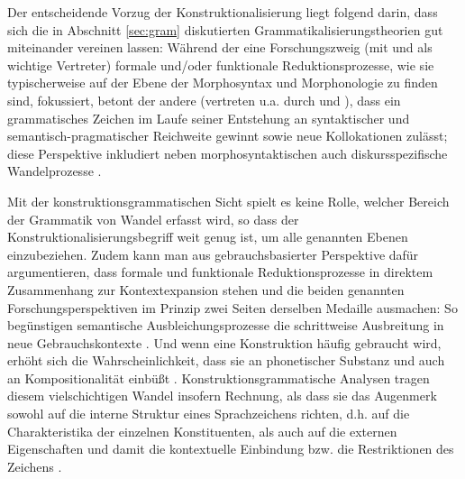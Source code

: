 Der entscheidende Vorzug der Konstruktionalisierung liegt \textcite[60--62]{Traugott2015} folgend darin, dass sich die in Abschnitt \ref{sec:gram}  diskutierten Grammatikalisierungstheorien gut miteinander vereinen lassen: Während der eine Forschungszweig (mit \citealt{Lehmann1995} und \citealt{Haspelmath2004} als wichtige Vertreter) formale und/\-oder funktionale Reduktionsprozesse, wie sie typischerweise auf der Ebene der Morphosyntax und Morphonologie zu finden sind, fokussiert, betont der andere (vertreten u.a. durch \citealt{Himmelmann2004} und \citealt{Croft2006}), dass ein grammatisches Zeichen im Laufe seiner Entstehung an syntaktischer und semantisch-pragmatischer Reichweite gewinnt sowie neue Kollokationen zulässt; diese Perspektive inkludiert neben morphosyntaktischen auch diskursspezifische Wandelprozesse \parencite[vgl. den Begriff der  für die Entwicklung von Diskursmarkern bei][]{Auer2005}. 

Mit der konstruktionsgrammatischen Sicht spielt es keine Rolle, welcher Bereich der Grammatik von Wandel erfasst wird, so dass der Konstruktionalisierungsbegriff weit genug ist, um alle genannten Ebenen einzubeziehen. Zudem kann man aus gebrauchsbasierter Perspektive dafür argumentieren, dass formale und funktionale Reduktionsprozesse in direktem Zusammenhang zur Kontextexpansion stehen und die beiden genannten Forschungsperspektiven im Prinzip zwei Seiten derselben Medaille ausmachen: So begünstigen semantische Ausbleichungsprozesse die schrittweise Ausbreitung in neue Gebrauchskontexte \parencite[61]{Traugott2015}. Und wenn eine Konstruktion häufig gebraucht wird, erhöht sich die Wahrscheinlichkeit, dass sie an phonetischer Substanz und auch an Kompositionalität einbüßt \parencite[20]{Bybee2010}.  Konstruktionsgrammatische Analysen tragen diesem vielschichtigen Wandel insofern Rechnung, als dass sie das Augenmerk sowohl auf die interne Struktur eines Sprachzeichens richten, d.h. auf die Charakteristika der einzelnen Konstituenten, als auch auf die externen Eigenschaften und damit die kontextuelle Einbindung bzw. die Restriktionen des Zeichens  \parencite[zu diesem externen/internen Kontrast s. weiterführend][]{Fried2013}.  

